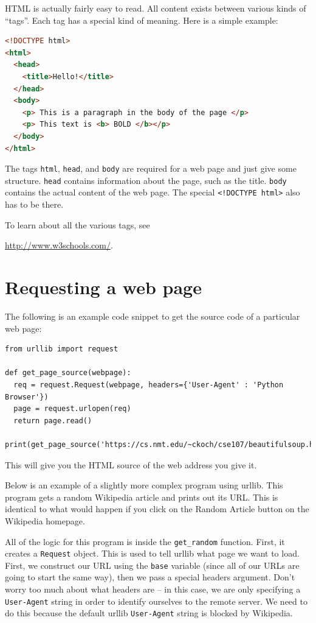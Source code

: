 \documentclass[11pt]{cselabheader}
\begin{document}
HTML is actually fairly easy to read. All content exists between
various kinds of ``tags''. Each tag has a special kind of
meaning. Here is a simple example:

\begin{lstlisting}[style=python, language=html]
<!DOCTYPE html>
<html>
  <head>
    <title>Hello!</title>
  </head>
  <body>
    <p> This is a paragraph in the body of the page </p>
    <p> This text is <b> BOLD </b></p>
  </body>
</html>
\end{lstlisting}

The tags \lstinline!html!, \lstinline!head!, and \lstinline!body! are required
for a web page and just give some structure. \lstinline!head! contains
information about the page, such as the title. \lstinline!body! contains the
actual content of the web page. The special \lstinline{<!DOCTYPE html>} also has
to be there.

To learn about all the various tags, see
\begin{center}
\url{http://www.w3schools.com/}.
\end{center}

\section{Requesting a web page}

The following is an example code snippet to get the source code of a particular
web page:
\begin{lstlisting}
from urllib import request

def get_page_source(webpage):
  req = request.Request(webpage, headers={'User-Agent' : 'Python Browser'})
  page = request.urlopen(req)
  return page.read()

print(get_page_source('https://cs.nmt.edu/~ckoch/cse107/beautifulsoup.html'))
\end{lstlisting}

This will give you the HTML source of the web address you give it.

Below is an example of a slightly more complex program using urllib. This
program gets a random Wikipedia article and prints out its URL. This
is identical to what would happen if you click on the Random Article button
on the Wikipedia homepage.



All of the logic for this program is inside the \lstinline{get_random}
function. First, it creates a \lstinline{Request} object. This is used
to tell urllib what page we want to load. First, we construct our URL using
the \lstinline{base} variable (since all of our URLs are going to start the
same way), then we pass a special headers argument. Don't worry too much about
what headers are -- in this case, we are only specifying a \lstinline{User-Agent}
string in order to identify ourselves to the remote server. We need to do this
because the default urllib \lstinline{User-Agent} string is blocked by
Wikipedia.
\end{document}
